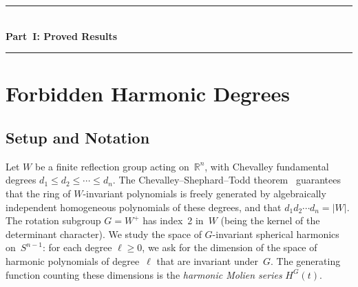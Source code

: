 \documentclass[11pt,letterpaper]{article}
\theoremstyle{definition}
\newcommand{\abs}[1]{\lvert #1 \rvert}
\begin{document}
\bigskip
\begin{center}
\rule{0.6\textwidth}{0.8pt}\\[6pt]
{\large\sffamily\bfseries Part~I:\; Proved Results}\\[4pt]
\rule{0.6\textwidth}{0.8pt}
\end{center}
\medskip
\section{Forbidden Harmonic Degrees}\label{sec:setup}
\subsection{Setup and Notation}
Let $W$ be a finite reflection group acting on~$\mathbb{R}^n$, with Chevalley fundamental degrees $d_1\le d_2\le\cdots\le d_n$.  The Chevalley--Shephard--Todd theorem~\cite{CST54} guarantees that the ring of $W$-invariant polynomials is freely generated by algebraically independent homogeneous polynomials of these degrees, and that $d_1 d_2\cdots d_n=\abs{W}$.
The rotation subgroup $G=W^+$ has index~2 in~$W$ (being the kernel of the determinant character).  We study the space of $G$-invariant spherical harmonics on~$S^{n-1}$: for each degree $\ell\ge 0$, we ask for the dimension of the space of harmonic polynomials of degree~$\ell$ that are invariant under~$G$.  The generating function counting these dimensions is the \emph{harmonic Molien series} $H^G(t)$.
\end{document}
